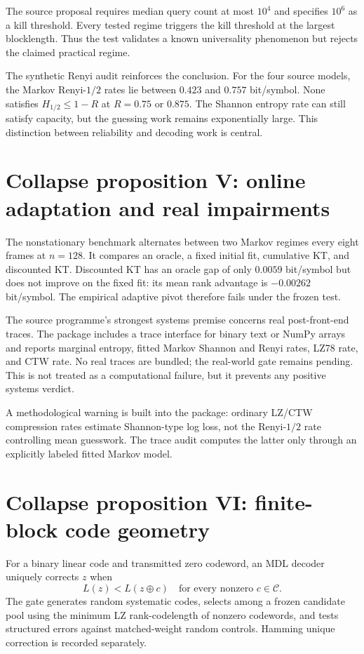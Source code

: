 \documentclass[11pt]{article}
\newcommand{\C}{\mathcal C}
\begin{document}
The source proposal requires median query count at most $10^4$ and specifies $10^6$ as a kill threshold.  Every tested regime triggers the kill threshold at the largest blocklength.  Thus the test validates a known universality phenomenon but rejects the claimed practical regime.

The synthetic Renyi audit reinforces the conclusion.  For the four source models, the Markov Renyi-$1/2$ rates lie between $0.423$ and $0.757$ bit/symbol.  None satisfies $H_{1/2}\le 1-R$ at $R=0.75$ or $0.875$.  The Shannon entropy rate can still satisfy capacity, but the guessing work remains exponentially large.  This distinction between reliability and decoding work is central.

\section{Collapse proposition V: online adaptation and real impairments}

The nonstationary benchmark alternates between two Markov regimes every eight frames at $n=128$.  It compares an oracle, a fixed initial fit, cumulative KT, and discounted KT.  Discounted KT has an oracle gap of only $0.0059$ bit/symbol but does not improve on the fixed fit: its mean rank advantage is $-0.00262$ bit/symbol.  The empirical adaptive pivot therefore fails under the frozen test.

The source programme's strongest systems premise concerns real post-front-end traces.  The package includes a trace interface for binary text or NumPy arrays and reports marginal entropy, fitted Markov Shannon and Renyi rates, LZ78 rate, and CTW rate.  No real traces are bundled; the real-world gate remains pending.  This is not treated as a computational failure, but it prevents any positive systems verdict.

A methodological warning is built into the package: ordinary LZ/CTW compression rates estimate Shannon-type log loss, not the Renyi-$1/2$ rate controlling mean guesswork.  The trace audit computes the latter only through an explicitly labeled fitted Markov model.

\section{Collapse proposition VI: finite-block code geometry}

For a binary linear code and transmitted zero codeword, an MDL decoder uniquely corrects $z$ when
\begin{equation}
 L(z)<L(z\oplus c)
 \quad\text{for every nonzero }c\in\C.
 \label{eq:mdlcondition}
\end{equation}
The gate generates random systematic codes, selects among a frozen candidate pool using the minimum LZ rank-codelength of nonzero codewords, and tests structured errors against matched-weight random controls.  Hamming unique correction is recorded separately.
\end{document}
